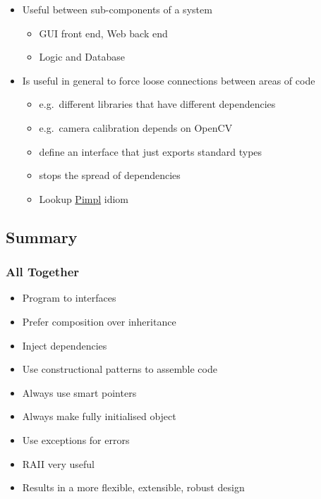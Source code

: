 \begin{itemize}
\itemsep1pt\parskip0pt
\item
  Useful between sub-components of a system

  \begin{itemize}
  \itemsep1pt\parskip0pt
  \item
    GUI front end, Web back end
  \item
    Logic and Database
  \end{itemize}
\item
  Is useful in general to force loose connections between areas of code

  \begin{itemize}
  \itemsep1pt\parskip0pt
  \item
    e.g.~different libraries that have different dependencies
  \item
    e.g.~camera calibration depends on OpenCV
  \item
    define an interface that just exports standard types
  \item
    stops the spread of dependencies
  \item
    Lookup \href{http://en.cppreference.com/w/cpp/language/pimpl}{Pimpl}
    idiom
  \end{itemize}
\end{itemize}

\subsection{Summary}\label{summary}

\subsubsection{All Together}\label{all-together}

\begin{itemize}
\itemsep1pt\parskip0pt
\item
  Program to interfaces
\item
  Prefer composition over inheritance
\item
  Inject dependencies
\item
  Use constructional patterns to assemble code
\item
  Always use smart pointers
\item
  Always make fully initialised object
\item
  Use exceptions for errors
\item
  RAII very useful
\item
  Results in a more flexible, extensible, robust design
\end{itemize}

